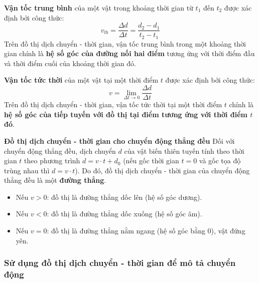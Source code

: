 \begin{kienthuc}
\textbf{Vận tốc trung bình} của một vật trong khoảng thời gian từ $t_1$ đến $t_2$ được xác định bởi công thức:
$$v_{tb} = \frac{\Delta d}{\Delta t} = \frac{d_2 - d_1}{t_2 - t_1}$$
Trên đồ thị dịch chuyển - thời gian, vận tốc trung bình trong một khoảng thời gian chính là \textbf{hệ số góc của đường nối hai điểm} tương ứng với thời điểm đầu và thời điểm cuối của khoảng thời gian đó.
\end{kienthuc}

\begin{kienthuc}
\textbf{Vận tốc tức thời} của một vật tại một thời điểm $t$ được xác định bởi công thức:
$$v = \lim_{\Delta t \to 0} \frac{\Delta d}{\Delta t}$$
Trên đồ thị dịch chuyển - thời gian, vận tốc tức thời tại một thời điểm $t$ chính là \textbf{hệ số góc của tiếp tuyến với đồ thị tại điểm tương ứng với thời điểm $t$ đó}.
\end{kienthuc}

\begin{emcobiet}
\textbf{Đồ thị dịch chuyển - thời gian cho chuyển động thẳng đều}
Đối với chuyển động thẳng đều, dịch chuyển $d$ của vật biến thiên tuyến tính theo thời gian $t$ theo phương trình $d = v \cdot t + d_0$ (nếu gốc thời gian $t=0$ và gốc tọa độ trùng nhau thì $d = v \cdot t$).
Do đó, đồ thị dịch chuyển - thời gian của chuyển động thẳng đều là một \textbf{đường thẳng}.
\begin{itemize}
    \item Nếu $v > 0$: đồ thị là đường thẳng dốc lên (hệ số góc dương).
    \item Nếu $v < 0$: đồ thị là đường thẳng dốc xuống (hệ số góc âm).
    \item Nếu $v = 0$: đồ thị là đường thẳng nằm ngang (hệ số góc bằng 0), vật đứng yên.
\end{itemize}
\end{emcobiet}

\subsubsection{Sử dụng đồ thị dịch chuyển - thời gian để mô tả chuyển động}

